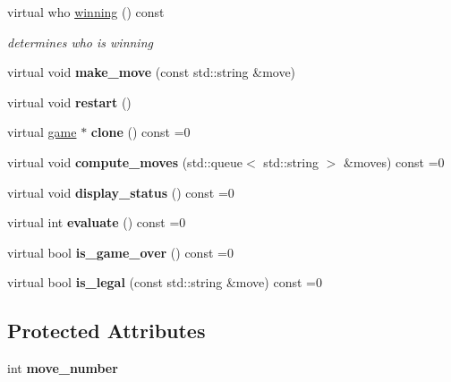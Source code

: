 \begin{DoxyCompactItemize}
virtual who \hyperlink{classmain__savitch__14_1_1game_a2f0d5338c12bd98d52fe2383ece5c45e}{winning} () const
\begin{DoxyCompactList}\small\item\em determines who is winning \end{DoxyCompactList}\item 
\mbox{\label{classmain__savitch__14_1_1game_a20597d0caa907aea47b27fed8be3759b}} 
virtual void {\bfseries make\+\_\+move} (const std\+::string \&move)
\item 
\mbox{\label{classmain__savitch__14_1_1game_ad521a7d78e7c163a0bc28b709f0d45fd}} 
virtual void {\bfseries restart} ()
\item 
\mbox{\label{classmain__savitch__14_1_1game_a7b663057f59210dd52738facfc40d959}} 
virtual \hyperlink{classmain__savitch__14_1_1game}{game} $\ast$ {\bfseries clone} () const =0
\item 
\mbox{\label{classmain__savitch__14_1_1game_a2c0c049f5861026d0f639b5837889b7a}} 
virtual void {\bfseries compute\+\_\+moves} (std\+::queue$<$ std\+::string $>$ \&moves) const =0
\item 
\mbox{\label{classmain__savitch__14_1_1game_ac8205178922c49bab2865187e834b726}} 
virtual void {\bfseries display\+\_\+status} () const =0
\item 
\mbox{\label{classmain__savitch__14_1_1game_a9b9c8c5e9aa57c9a430f20b87cb047aa}} 
virtual int {\bfseries evaluate} () const =0
\item 
\mbox{\label{classmain__savitch__14_1_1game_a49eed20648918b03fd3e2cf78987b3d1}} 
virtual bool {\bfseries is\+\_\+game\+\_\+over} () const =0
\item 
\mbox{\label{classmain__savitch__14_1_1game_ad38351422ca1ee3ae58440c1c6b36b30}} 
virtual bool {\bfseries is\+\_\+legal} (const std\+::string \&move) const =0
\end{DoxyCompactItemize}
\subsection*{Protected Attributes}
\begin{DoxyCompactItemize}
\item 
\mbox{\label{classmain__savitch__14_1_1game_ac4c296f4370d8e5bb5ea74b638fb827d}} 
int {\bfseries move\+\_\+number}
\end{DoxyCompactItemize}


